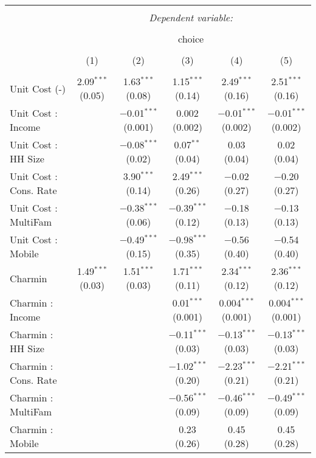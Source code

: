 
\begin{table}[!htbp] \centering 
  \caption{} 
  \label{tab:mnlPhiladelphiaObsHet} 
\begin{tabular}{@{\extracolsep{5pt}}lccccc} 
\\[-1.8ex]\hline 
\hline \\[-1.8ex] 
 & \multicolumn{5}{c}{\textit{Dependent variable:}} \\ 
\cline{2-6} 
\\[-1.8ex] & \multicolumn{5}{c}{choice} \\ 
\\[-1.8ex] & (1) & (2) & (3) & (4) & (5)\\ 
\hline \\[-1.8ex] 
 Unit Cost (-) & 2.09$^{***}$ (0.05) & 1.63$^{***}$ (0.08) & 1.15$^{***}$ (0.14) & 2.49$^{***}$ (0.16) & 2.51$^{***}$ (0.16) \\ 
  Unit Cost : Income &  & $-$0.01$^{***}$ (0.001) & 0.002 (0.002) & $-$0.01$^{***}$ (0.002) & $-$0.01$^{***}$ (0.002) \\ 
  Unit Cost : HH Size &  & $-$0.08$^{***}$ (0.02) & 0.07$^{**}$ (0.04) & 0.03 (0.04) & 0.02 (0.04) \\ 
  Unit Cost : Cons. Rate &  & 3.90$^{***}$ (0.14) & 2.49$^{***}$ (0.26) & $-$0.02 (0.27) & $-$0.20 (0.27) \\ 
  Unit Cost : MultiFam &  & $-$0.38$^{***}$ (0.06) & $-$0.39$^{***}$ (0.12) & $-$0.18 (0.13) & $-$0.13 (0.13) \\ 
  Unit Cost : Mobile &  & $-$0.49$^{***}$ (0.15) & $-$0.98$^{***}$ (0.35) & $-$0.56 (0.40) & $-$0.54 (0.40) \\ 
  Charmin & 1.49$^{***}$ (0.03) & 1.51$^{***}$ (0.03) & 1.71$^{***}$ (0.11) & 2.34$^{***}$ (0.12) & 2.36$^{***}$ (0.12) \\ 
  Charmin : Income &  &  & 0.01$^{***}$ (0.001) & 0.004$^{***}$ (0.001) & 0.004$^{***}$ (0.001) \\ 
  Charmin : HH Size &  &  & $-$0.11$^{***}$ (0.03) & $-$0.13$^{***}$ (0.03) & $-$0.13$^{***}$ (0.03) \\ 
  Charmin : Cons. Rate &  &  & $-$1.02$^{***}$ (0.20) & $-$2.23$^{***}$ (0.21) & $-$2.21$^{***}$ (0.21) \\ 
  Charmin : MultiFam &  &  & $-$0.56$^{***}$ (0.09) & $-$0.46$^{***}$ (0.09) & $-$0.49$^{***}$ (0.09) \\ 
  Charmin : Mobile &  &  & 0.23 (0.26) & 0.45 (0.28) & 0.45 (0.28) \\ 

\end{tabular}
\end{table}
